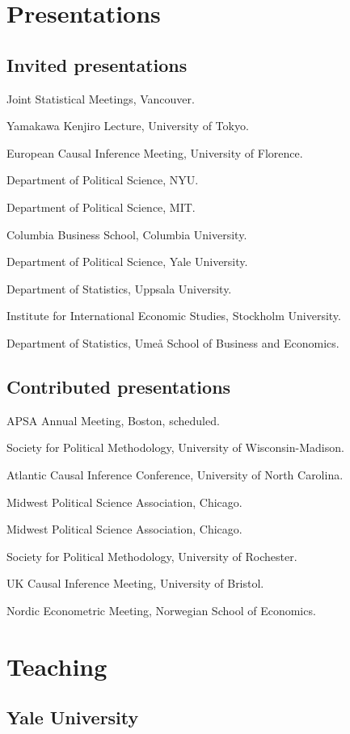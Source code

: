 \documentclass[10pt,letterpaper]{article}
\newenvironment{singledatelist}{
	\begin{list}{}{
		\setlength{\parskip}{0pt}
		\setlength{\itemsep}{4pt}
		\setlength{\parsep}{0.3em}
		\setlength{\leftmargin}{5em}
		\setlength{\labelwidth}{6em}
		\setlength{\labelsep}{1.5em}
		}
	}{
\end{list}
}
\newcommand{\dateitem}[2][]{\item[{#1}] {#2}}
\begin{document}
	\section*{Presentations}

	\subsection*{Invited presentations}

	\begin{singledatelist}
		\dateitem[2018]{Joint Statistical Meetings, Vancouver.}
		\dateitem{Yamakawa Kenjiro Lecture, University of Tokyo.}
		\dateitem{European Causal Inference Meeting, University of Florence.}
		\dateitem{Department of Political Science, NYU.}
		\dateitem{Department of Political Science, MIT.}
		\dateitem[2016]{Columbia Business School, Columbia University.}
		\dateitem[2015]{Department of Political Science, Yale University.}
		\dateitem{Department of Statistics, Uppsala University.}
		\dateitem{Institute for International Economic Studies, Stockholm University.}
		\dateitem[2013]{Department of Statistics, Umeå School of Business and Economics.}
	\end{singledatelist}


	\subsection*{Contributed presentations}

	\begin{singledatelist}
		\dateitem[2018]{APSA Annual Meeting, Boston, scheduled.}
		\dateitem[2017]{Society for Political Methodology, University of Wisconsin-Madison.}
		\dateitem{Atlantic Causal Inference Conference, University of North Carolina.}
		\dateitem{Midwest Political Science Association, Chicago.}
		\dateitem[2016]{Midwest Political Science Association, Chicago.}
		\dateitem[2015]{Society for Political Methodology, University of Rochester.}
		\dateitem{UK Causal Inference Meeting, University of Bristol.}
		\dateitem[2013]{Nordic Econometric Meeting, Norwegian School of Economics.}
	\end{singledatelist}


	\section*{Teaching}

	\subsection*{Yale University}
\end{document}
